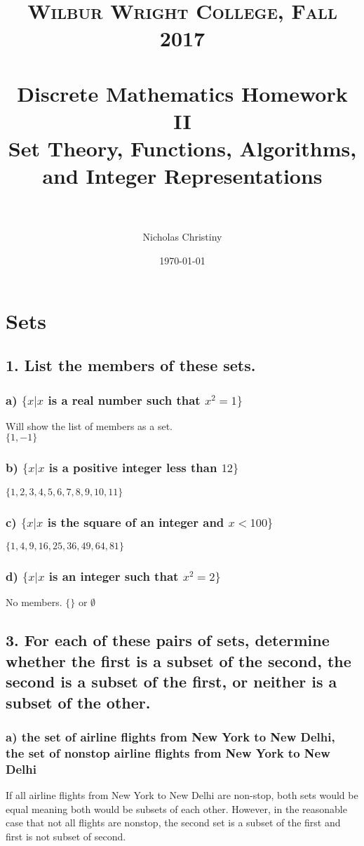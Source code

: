 \documentclass[11pt, oneside]{article} %
\title{
\normalfont \normalsize
\textsc{Wilbur Wright College, Fall 2017} \\ [25pt] %
\horrule{0.5pt} \\[0.4cm] %
\huge Discrete Mathematics Homework II \\
\huge Set Theory, Functions, Algorithms, and Integer Representations \\ %
\horrule{2pt} \\[0.5cm] %
}
\author{Nicholas Christiny} %
\date{\normalsize\today} %
\numberwithin{equation}{section} %
\numberwithin{figure}{section} %
\numberwithin{table}{section} %
\begin{document}
\maketitle %


\section{ Sets}
\subsection{1. List the members of these sets.}
\subsubsection{a) $\{x| x$ is a real number such that $x^2 =1\}$}
Will show the list of members as a set. \\
$\{1, -1\}$
\subsubsection{b) $\{x | x$ is a positive integer less than $12\}$}
$\{1,2,3,4,5,6,7,8,9,10,11\}$
\subsubsection{c) $\{x|x$ is the square of an integer and $x<100\}$}
$\{1,4,9,16,25,36,49,64,81\}$
\subsubsection{d) $\{x|x$ is an integer such that $x^2 =2\}$}
No members. $\{\}$ or $\emptyset$


\subsection{3. For each of these pairs of sets, determine whether the first is a subset of the second, the second is a subset of the first, or neither is a subset of the other.}
\subsubsection{a) the set of airline flights from New York to New Delhi,\\
the set of nonstop airline flights from New York to New Delhi}
If all airline flights from New York to New Delhi are non-stop, both sets would be equal meaning both would be subsets of each other. However, in the reasonable case that not all flights are nonstop, the second set is a subset of the first and first is not subset of second.
\end{document}
